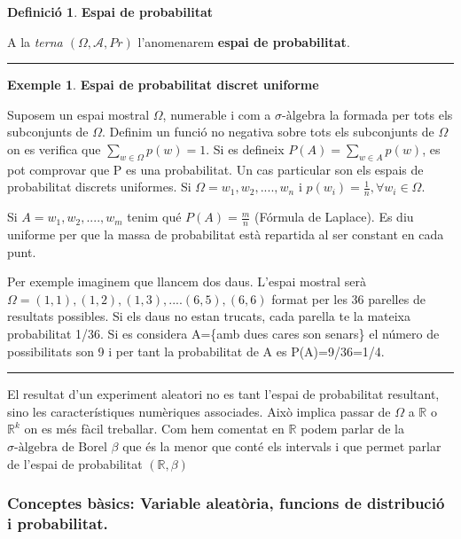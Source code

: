 \documentclass[
  catalan,
]{article}
\theoremstyle{definition}
\newtheorem{definition}{Definició}[section]
\theoremstyle{definition}
\newtheorem{example}{Exemple}[section]
\theoremstyle{definition}
\theoremstyle{definition}
\theoremstyle{remark}
\begin{document}
\begin{definition}
\textbf{Espai de probabilitat}

A la \emph{terna \((\Omega,\mathcal{A},Pr)\)} l'anomenarem \textbf{espai de probabilitat}.
\end{definition}

\begin{center}\rule{0.5\linewidth}{0.5pt}\end{center}

\begin{example}
\textbf{Espai de probabilitat discret uniforme}

Suposem un espai mostral \(\Omega\), numerable i com a \(\sigma\text{-àlgebra}\) la formada per tots els subconjunts de \(\Omega\). Definim un funció no negativa sobre tots els subconjunts de \(\Omega\) on es verifica que \(\sum_{w\in \Omega}p(w)=1\). Si es defineix \(P(A)=\sum_{w\in A}p(w)\), es pot comprovar que P es una probabilitat.
Un cas particular son els espais de probabilitat discrets uniformes. Si \(\Omega={w_1,w_2,....,w_n}\) i \(p(w_i)=\frac{1}{n}, \forall w_i \in \Omega\).

Si \(A={w_1,w_2,....,w_m}\) tenim qué \(P(A)=\frac {m}{n}\) (Fórmula de Laplace). Es diu uniforme per que la massa de probabilitat està repartida al ser constant en cada punt.

Per exemple imaginem que llancem dos daus. L'espai mostral serà \(\Omega={(1,1),(1,2),(1,3),....(6,5),(6,6)}\) format per les 36 parelles de resultats possibles. Si els daus no estan trucats, cada parella te la mateixa probabilitat 1/36. Si es considera A=\{amb dues cares son senars\} el número de possibilitats son 9 i per tant la probabilitat de A es P(A)=9/36=1/4.
\end{example}

\begin{center}\rule{0.5\linewidth}{0.5pt}\end{center}

El resultat d'un experiment aleatori no es tant l'espai de probabilitat resultant, sino les característiques numèriques associades. Això implica passar de \(\Omega\) a \(\mathbb{R}\) o \(\mathbb{R}^k\) on es més fàcil treballar. Com hem comentat en \(\mathbb{R}\) podem parlar de la \(\sigma\text{-àlgebra}\) de Borel \(\beta\) que és la menor que conté els intervals i que permet parlar de l'espai de probabilitat \((\mathbb{R},\beta)\)

\subsubsection{Conceptes bàsics: Variable aleatòria, funcions de distribució i probabilitat.}\label{conceptes-buxe0sics-variable-aleatuxf2ria-funcions-de-distribuciuxf3-i-probabilitat.}
\end{document}
